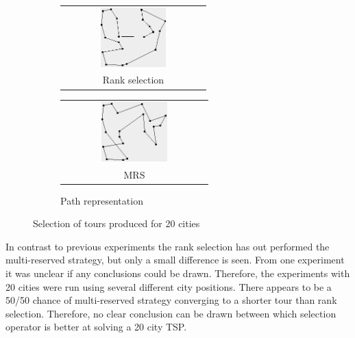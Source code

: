 \documentclass[10pt,a4paper,openbib]{article}
\makeatletter
\newcommand{\subsubfloat}[2]{%
  \begin{tabular}{@{}c@{}}#1\\#2\end{tabular}%
}
\makeatother
\begin{document}
\begin{multicols}{2}
\begin{figure}[H]
\begin{center}
\begin{subfigure}[b]{0.24\textwidth}
    \end{subfigure}
    \begin{subfigure}[b]{0.24\textwidth}
    \begin{minipage}{\textwidth}\footnotesize

  		\subsubfloat{\includegraphics[width=0.48\textwidth]{images/result4/Pathfalse3.png}}{Rank selection}\label{fig:cities20toursOR}
  		\subsubfloat{\includegraphics[width=0.48\textwidth]{images/result4/Pathtrue9.png}}{MRS}\label{fig:cities20toursOM}
 		\caption{Path representation}\label{fig:cities20toursO}
  \end{minipage}
        
    \end{subfigure} 
    \caption{Selection of tours produced for 20 cities}
    \label{fig:cities20tours}
\end{center}
\end{figure}


\noindent In contrast to previous experiments the rank selection has out performed the multi-reserved strategy, but only a small difference is seen. From one experiment it was unclear if any conclusions could be drawn. Therefore, the experiments with 20 cities were run using several different city positions. There appears to be a 50/50 chance of multi-reserved strategy converging to a shorter tour than rank selection. Therefore, no clear conclusion can be drawn between which selection operator is better at solving a 20 city TSP.\\


\end{multicols}
\end{document}
